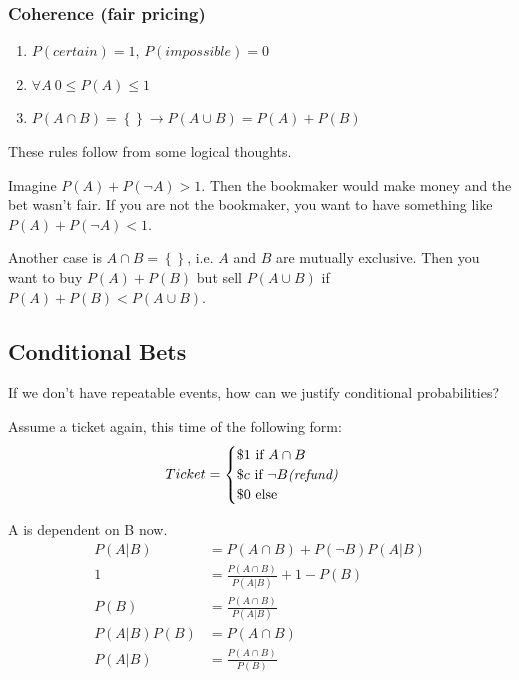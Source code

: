 \documentclass[../main/Notes.tex]{subfiles}
\begin{document}
\subsubsection*{Coherence (fair pricing)}
\begin{enumerate}
	\item $P(certain) = 1$, $P(impossible) = 0$
  \item $\forall A\ 0 \leq P(A) \leq 1$
  \item $P(A \cap B) = \left\{\right\} \rightarrow P(A \cup B) = P(A) + P(B)$
\end{enumerate}

These rules follow from some logical thoughts.

Imagine $P(A) + P(\neg A) > 1$. Then the bookmaker would make money and the bet wasn't fair. If you are not the bookmaker, you want to have something like $P(A) + P(\neg A) < 1$.

Another case is $A \cap B = \left\{\right\}$, i.e. $A$ and $B$ are mutually exclusive. Then you want to buy $P(A)+P(B)$ but sell $P(A \cup B)$ if $P(A) + P(B) < P(A \cup B)$.

\subsection{Conditional Bets}
If we don't have repeatable events, how can we justify conditional probabilities?

Assume a ticket again, this time of the following form:
\begin{align*}
Ticket = 
  \begin{cases}
    \$1 \mbox{ if } A \cap B \\
    \$c \mbox{ if } \neg B \mbox{\textit{(refund)}} \\
    \$0 \mbox{ else}
  \end{cases}
\end{align*}

A is dependent on B now.
\begin{align*}
P(A|B)     &=       P(A \cap B)          + P(\neg B) P(A|B) \\
         1 &= \frac{P(A \cap B)}{P(A|B)} + 1 - P(B)         \\
      P(B) &= \frac{P(A \cap B)}{P(A|B)}                    \\
P(A|B)P(B) &=       P(A \cap B)                             \\
P(A|B)     &= \frac{P(A \cap B)}{P(B)}
\end{align*}
\end{document}
